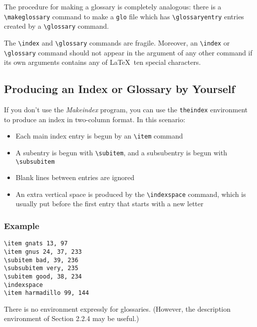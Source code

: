 \documentclass{article}
\begin{document}
The procedure for making a glossary is completely analogous: there is a \verb:\makeglossary: command
to make a {\tt glo} file which has \verb:\glossaryentry: entries created by a \verb:\glossary:
command.

The \verb:\index: and \verb:\glossary: commands are fragile. Moreover,
an \verb:\index: or \verb:\glossary: command should not appear in the argument of any other command
if its own arguments contains any of \LaTeX\ ten special characters.

\subsection{Producing an Index or Glossary by Yourself}\label{manual-production-index}

If you don't use the \emph{Makeindex} program, you can use the {\tt theindex} environment to produce
an index in two-column format. In this scenario:

\begin{itemize}
   \item Each main index entry is begun by an \verb:\item: command
   \item A subentry is begun with \verb:\subitem:, and a subsubentry is begun with \verb:\subsubitem:
   \item Blank lines between entries are ignored
   \item An extra vertical space is produced by the \verb:\indexspace: command, which is usually
    put before the first entry that starts with a new letter
\end{itemize}

\subsubsection*{Example}

\begin{verbatim}
\item gnats 13, 97
\item gnus 24, 37, 233
\subitem bad, 39, 236
\subsubitem very, 235
\subitem good, 38, 234
\indexspace
\item harmadillo 99, 144
\end{verbatim}

There is no environment expressly for glossaries. (However, the description environment of Section
2.2.4 may be useful.)


\end{document}
